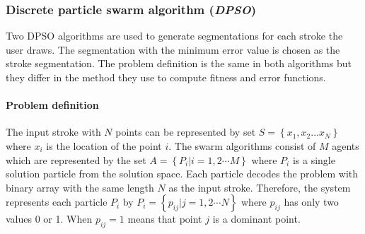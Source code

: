 \documentclass[a4paper,10pt]{IEEEconf}
\begin{document}
\subsubsection{Discrete particle swarm algorithm (\textit{DPSO})}
\label{subsubsec:Discreteparticleswarmalgorithm}
Two DPSO algorithms are used to generate segmentations for each stroke the user draws. The segmentation with the minimum error value is chosen as the stroke segmentation. The problem definition is the same in both algorithms but they differ in the method they use to compute fitness and error functions.  
\paragraph{Problem definition}
The input stroke with $N$ points can be represented by set $S = \left\{ {x_1 ,x_2  \ldots x_N } \right\}$ where $x_i$ is the location of the point $i$. The swarm algorithms consist of $M$ agents which are represented by the set 
$A  = \left\{ {P_i \left| {i = 1,2 \cdots M} \right.} \right\}$ where $P_i$ is a single solution particle from the solution space. Each particle decodes the problem with binary array with the same length $N$ as the input stroke.  
Therefore, the system represents each particle $P_i$ by $P_i = \left\{ {p_{ij} \left| {j = 1,2 \cdots N} \right.} \right\}$ where $p_{ij}$ has only two values 0 or 1. When $p_{ij}=1$ means that point $j$ is a dominant point. 
\end{document}
